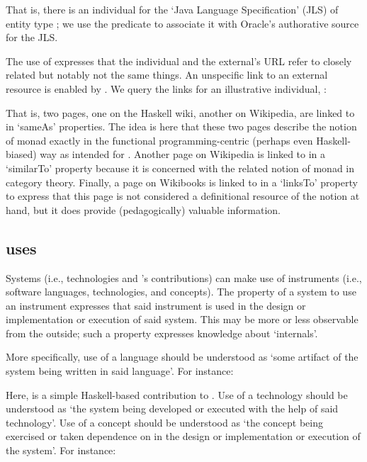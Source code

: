 
\noindent
That is, there is an \solasote{} individual for the `Java Language
Specification' (JLS) of entity type ; we use the
 predicate to associate it with Oracle's authorative
source for the JLS.

The use of  expresses that the \solasote{}
individual and the external's URL refer to closely related but notably
not the same things. An unspecific link to an external resource is
enabled by . We query the links for an illustrative
individual, :



\noindent
That is, two pages, one on the Haskell wiki, another on Wikipedia, are
linked to in `sameAs' properties. The idea is here that these two
pages describe the notion of monad exactly in the functional
programming-centric (perhaps even Haskell-biased) way as intended for
\solasote. Another page on Wikipedia is linked to in a `similarTo'
property because it is concerned with the related notion of monad in
category theory. Finally, a page on Wikibooks is linked to in a
`linksTo' property to express that this page is not considered a
definitional resource of the notion at hand, but it does provide
(pedagogically) valuable information.


\subsection{uses} 
\label{S:uses}

Systems (i.e., technologies and \ooo{}'s contributions) can make use
of instruments (i.e., software languages, technologies, and
concepts). The property of a system to use an instrument expresses
that said instrument is used in the design or implementation or
execution of said system. This may be more or less observable from the
outside; such a property expresses knowledge about `internals'.

More specifically, use of a language should be understood as `some
artifact of the system being written in said language'. For instance:


\noindent
Here,  is a simple Haskell-based contribution
to \ooo{}. Use of a technology should be understood as `the system
being developed or executed with the help of said technology'. Use of
a concept should be understood as `the concept being exercised or
taken dependence on in the design or implementation or execution of
the system'. For instance:

